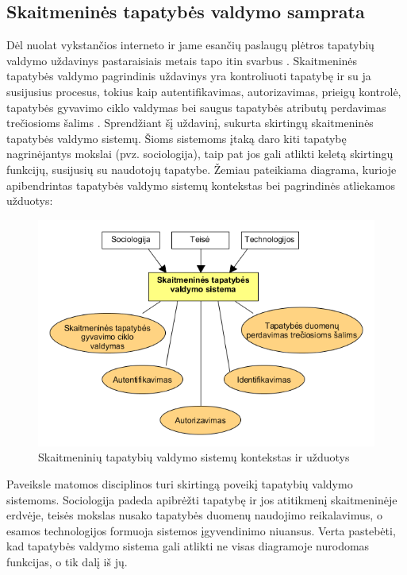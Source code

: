 \subsection{Skaitmeninės tapatybės valdymo samprata}

Dėl nuolat vykstančios interneto ir jame esančių paslaugų plėtros tapatybių
valdymo uždavinys pastaraisiais metais tapo itin svarbus \cite{Glasser2009}. Skaitmeninės tapatybės valdymo pagrindinis uždavinys yra kontroliuoti
tapatybę ir su ja susijusius procesus, tokius kaip autentifikavimas, autorizavimas, prieigų kontrolė,
tapatybės gyvavimo ciklo valdymas bei saugus tapatybės atributų perdavimas trečiosioms šalims \cite{Cao2010, Dabrowski2008}. Sprendžiant šį uždavinį,
sukurta skirtingų skaitmeninės tapatybės valdymo sistemų. Šioms sistemoms įtaką daro
kiti tapatybę nagrinėjantys mokslai (pvz. sociologija), taip pat jos gali atlikti keletą skirtingų funkcijų, susijusių
su naudotojų tapatybe. Žemiau pateikiama diagrama,
kurioje apibendrintas tapatybės valdymo sistemų kontekstas bei pagrindinės atliekamos užduotys:

\begin{figure}[H]
    \centering
    \includegraphics[scale=0.8]{img/IDMcontextAndUsecases}
    \caption{Skaitmeninių tapatybių valdymo sistemų kontekstas ir užduotys \cite{Glasser2009}}
    \label{fig:IDMContext}
\end{figure}

Paveiksle matomos disciplinos turi skirtingą poveikį tapatybių valdymo sistemoms. 
Sociologija padeda apibrėžti tapatybę ir jos atitikmenį skaitmeninėje erdvėje, teisės mokslas nusako tapatybės duomenų naudojimo reikalavimus,
o esamos technologijos formuoja sistemos įgyvendinimo niuansus. Verta pastebėti, kad tapatybės valdymo sistema gali atlikti ne visas
diagramoje nurodomas funkcijas, o tik dalį iš jų.


